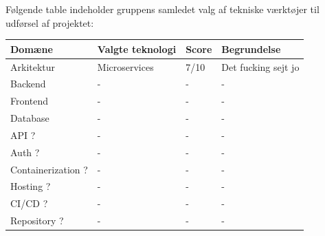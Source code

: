 \documentclass[12pt,a4paper]{article}
\begin{document}





\newpage
Følgende table indeholder gruppens samledet valg af tekniske værktøjer til udførsel af projektet:\\
\begin{tabular}{|l|l|l|l|}
    \hline
    \rowcolor{gray!30}
    \textbf{Domæne} & \textbf{Valgte teknologi} & \textbf{Score} & \textbf{Begrundelse} \\
    \hline
    Arkitektur & Microservices & 7/10 & Det fucking sejt jo \\
    \hline
    Backend & - & - & - \\
    \hline
    Frontend & - & - & - \\
    \hline
    Database & - & - & - \\
    \hline
    API ? & - & - & - \\
    \hline
    Auth ? & - & - & - \\
    \hline
    Containerization ? & - & - & - \\
    \hline
    Hosting ? & - & - & - \\
    \hline
    CI/CD ? & - & - & - \\
    \hline
    Repository ? & - & - & - \\
    \hline
\end{tabular}





\end{document}
